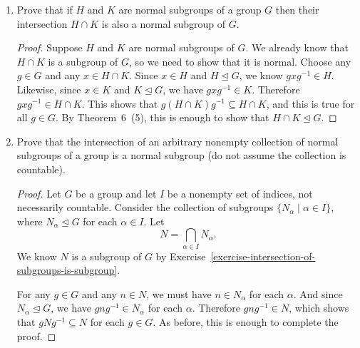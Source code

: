 \begin{enumerate}
\item Prove that if $H$ and $K$ are normal subgroups of a group $G$
  then their intersection $H\cap K$ is also a normal subgroup of $G$.
  \begin{proof}
    Suppose $H$ and $K$ are normal subgroups of $G$. We already know
    that $H\cap K$ is a subgroup of $G$, so we need to show that it is
    normal. Choose any $g\in G$ and any $x\in H\cap K$. Since $x\in H$
    and $H\trianglelefteq G$, we know $gxg^{-1}\in H$. Likewise, since
    $x\in K$ and $K\trianglelefteq G$, we have $gxg^{-1}\in
    K$. Therefore $gxg^{-1}\in H\cap K$. This shows that
    $g(H\cap K)g^{-1}\subseteq H\cap K$, and this is true for all
    $g\in G$. By Theorem~6~(5), this is enough to show that
    $H\cap K\trianglelefteq G$.
  \end{proof}
\item Prove that the intersection of an arbitrary nonempty collection
  of normal subgroups of a group is a normal subgroup (do not assume
  the collection is countable).
  \begin{proof}
    Let $G$ be a group and let $I$ be a nonempty set of indices, not
    necessarily countable. Consider the collection of subgroups
    $\{N_\alpha \mid \alpha\in I\}$, where $N_\alpha\trianglelefteq G$
    for each $\alpha\in I$. Let
    \begin{equation*}
      N = \bigcap_{\alpha\in I}N_\alpha.
    \end{equation*}
    We know $N$ is a subgroup of $G$ by
    Exercise~\ref{exercise-intersection-of-subgroups-is-subgroup}.

    For any $g\in G$ and any $n\in N$, we must have $n\in N_\alpha$
    for each $\alpha$. And since $N_\alpha\trianglelefteq G$, we have
    $gng^{-1}\in N_\alpha$ for each $\alpha$. Therefore
    $gng^{-1}\in N$, which shows that $gNg^{-1}\subseteq N$ for each
    $g\in G$. As before, this is enough to complete the proof.
  \end{proof}
\end{enumerate}

